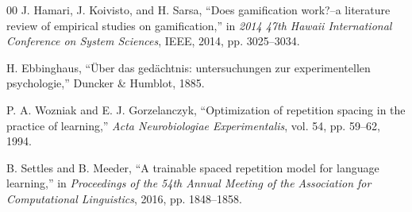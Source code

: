 \documentclass[conference]{IEEEtran}
\begin{document}
\begin{thebibliography}{00}
 J. Hamari, J. Koivisto, and H. Sarsa, ``Does gamification work?--a literature review of empirical studies on gamification,'' in \textit{2014 47th Hawaii International Conference on System Sciences}, IEEE, 2014, pp. 3025--3034.

 H. Ebbinghaus, ``{\"U}ber das ged{\"a}chtnis: untersuchungen zur experimentellen psychologie,'' Duncker \& Humblot, 1885.

 P. A. Wozniak and E. J. Gorzelanczyk, ``Optimization of repetition spacing in the practice of learning,'' \textit{Acta Neurobiologiae Experimentalis}, vol. 54, pp. 59--62, 1994.

 B. Settles and B. Meeder, ``A trainable spaced repetition model for language learning,'' in \textit{Proceedings of the 54th Annual Meeting of the Association for Computational Linguistics}, 2016, pp. 1848--1858.

\end{thebibliography}
\end{document}
